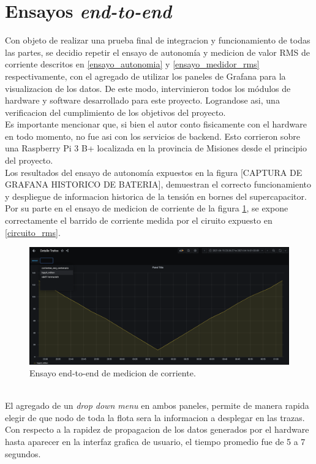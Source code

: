 \section{Ensayos \textit{end-to-end}}
Con objeto de realizar una prueba final de integracion y funcionamiento de todas las partes, se decidio repetir el ensayo de autonomía y medicion de valor RMS de corriente descritos en \ref{ensayo_autonomia} y \ref{ensayo_medidor_rms} respectivamente, con el agregado de utilizar los paneles de Grafana para la visualizacion de los datos. De este modo, intervinieron todos los m\'{o}dulos de hardware y software desarrollado para este proyecto. Lograndose asi, una verificacion del cumplimiento de los objetivos del proyecto.\\
Es importante mencionar que, si bien el autor conto fisicamente con el hardware en todo momento, no fue asi con los servicios de backend. Esto corrieron sobre una Raspberry Pi 3 B+ localizada en la provincia de Misiones desde el principio del proyecto.\\
Los resultados del ensayo de autonomía expuestos en la figura [CAPTURA DE GRAFANA HISTORICO DE BATERIA], demuestran el correcto funcionamiento y despliegue de informacion historica de la tensión en bornes del supercapacitor.\\
Por su parte en el ensayo de medicion de corriente de la figura \ref{fig:capturahistoricodropdown}, se expone correctamente el barrido de corriente medida por el ciruito expuesto en \ref{circuito_rms}.\\
\begin{figure}[h]
	\centering
	\includegraphics[width=1.0\linewidth]{Figures/captura_historico_dropdown}
	\caption{Ensayo end-to-end de medicion de corriente.}
	\label{fig:capturahistoricodropdown}
\end{figure}\\
El agregado de un \textit{drop down menu} en ambos paneles, permite de manera rapida elegir de que nodo de toda la flota sera la informacion a desplegar en las trazas.\\
Con respecto a la rapidez de propagacion de los datos generados por el hardware hasta aparecer en la interfaz grafica de usuario, el tiempo promedio fue de 5 a 7 segundos.